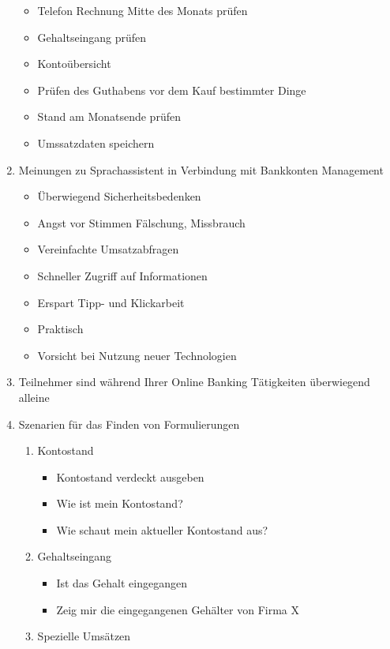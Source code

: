 \begin{enumerate}
\begin{itemize}
        \item Telefon Rechnung Mitte des Monats prüfen
        \item Gehaltseingang prüfen
        \item Kontoübersicht
        \item Prüfen des Guthabens vor dem Kauf bestimmter Dinge
        \item Stand am Monatsende prüfen
        \item Umssatzdaten speichern
    \end{itemize}
    \item Meinungen zu Sprachassistent in Verbindung mit Bankkonten Management
    \begin{itemize}
        \item Überwiegend Sicherheitsbedenken
        \item Angst vor Stimmen Fälschung, Missbrauch
        \item Vereinfachte Umsatzabfragen
        \item Schneller Zugriff auf Informationen
        \item Erspart Tipp- und Klickarbeit
        \item Praktisch
        \item Vorsicht bei Nutzung neuer Technologien
    \end{itemize}
    \item Teilnehmer sind während Ihrer Online Banking Tätigkeiten überwiegend alleine
    \item Szenarien für das Finden von Formulierungen
    \begin{enumerate}
        \item Kontostand
        \begin{itemize}
            \item Kontostand verdeckt ausgeben
            \item Wie ist mein Kontostand?
            \item Wie schaut mein aktueller Kontostand aus?
        \end{itemize}
        \item Gehaltseingang
        \begin{itemize}
            \item Ist das Gehalt eingegangen
            \item Zeig mir die eingegangenen Gehälter von Firma X
        \end{itemize}
        \item Spezielle Umsätzen
        \begin{itemize}

\end{itemize}
\end{enumerate}
\end{enumerate}
